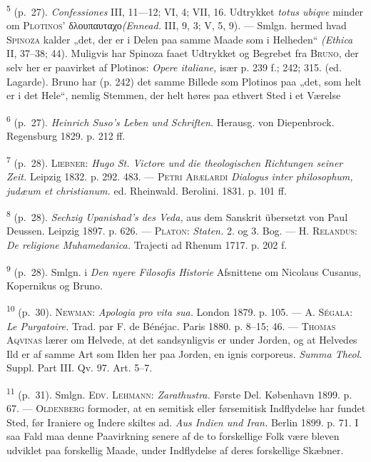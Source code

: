 \documentclass[12pt,a4paper,openany]{book}
\begin{document}
\begin{small}
\textsuperscript{5} (p.~27). \textit{Confessiones} III, 11---12; VI, 4;
VII, 16. Udtrykket
\textit{totus ubiqve} minder om \textsc{Plotinos’}
δλουπαυταχο\textit{(Ennead.} III, 9, 3; V, 5, 9). --- Smlgn. hermed hvad
\textsc{Spinoza} kalder „det, der er i Delen paa samme Maade som i
Helheden“ \textit{(Ethica} II, 37--38; 44). Muligvis har Spinoza faaet
Udtrykket og Begrebet fra \textsc{Bruno}, der selv her er paavirket af
Plotinos: \textit{Opere italiane,} især p. 239 f.; 242; 315. (ed.
Lagarde). Bruno har (p. 242) det samme Billede som Plotinos paa „det,
som helt er i det Hele“, nemlig Stemmen, der helt høres paa ethvert Sted
i et Værelse

\textsuperscript{6} (p.~27). \textit{Heinrich Suso’s Leben und
Schriften.} Herausg. von Diepenbrock.
Regensburg 1829. p. 212 ff.

\textsuperscript{7} (p.~28). \textsc{Liebner}: \textit{Hugo St. Victore
und die theologischen
Richtungen seiner Zeit.} Leipzig 1832. p. 292. 483. --- \textsc{Petri
Abælardi} \textit{Dialogus inter philosophum, judæum et christianum.}
ed. Rheinwald. Berolini. 1831. p. 101 ff.

\textsuperscript{8} (p.~28). \textit{Sechzig Upanishad’s des Veda,} aus
dem Sanskrit übersetzt von
Paul Deussen. Leipzig 1897. p. 626. --- \textsc{Platon}:
\textit{Staten.} 2. og 3. Bog. --- H. \textsc{Relandus:} \textit{De
religione Muhamedanica.} Trajecti ad Rhenum 1717. p. 202 f.

\textsuperscript{9} (p.~28). Smlgn. i \textit{Den nyere Filosofis
Historie} Afsnittene om Nicolaus
Cusanus, Kopernikus og Bruno.

\textsuperscript{10} (p.~30). \textsc{Newman}: \textit{Apologia pro vita
sua.} London 1879. p. 105.
--- A. \textsc{Ségala}: \textit{Le Purgatoire.} Trad. par F. de Bénéjac.
Paris 1880. p. 8--15; 46. --- \textsc{Thomas Aqvinas} lærer om Helvede,
at det sandsynligvis er under Jorden, og at Helvedes Ild er af samme Art
som Ilden her paa Jorden, en ignis corporeus. \textit{Summa Theol.}
Suppl. Part III. Qv. 97. Art. 5--7.

\textsuperscript{11} (p.~31). Smlgn. \textsc{Edv. Lehmann}:
\textit{Zarathustra.} Første Del.
København 1899. p. 67. --- \textsc{Oldenberg} formoder, at en semitisk
eller førsemitisk Indflydelse har fundet Sted, før Iraniere og Indere
skiltes ad. \textit{Aus Indien und Iran.} Berlin 1899. p. 71. I saa Fald
maa denne Paavirkning senere af de to forskellige Folk være bleven
udviklet paa forskellig Maade, under Indflydelse af deres forskellige
Skæbner.


\end{small}
\end{document}
